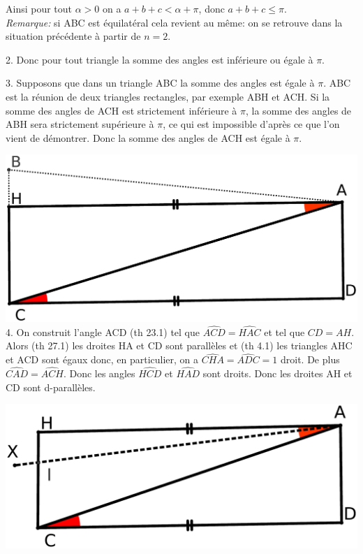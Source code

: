 \documentclass[a4paper, 12pt, twoside]{book}
\begin{document}
Ainsi pour tout $\alpha>0$ on a $a+b+c<\alpha+\pi$, donc $a+b+c\leq \pi$.\\

\textit{Remarque:} si ABC est équilatéral cela revient au même: on se retrouve dans la situation précédente à partir de $n=2$.\

2. Donc pour tout triangle la somme des angles est inférieure ou égale à $\pi$.\

3. Supposons que dans un triangle ABC la somme des angles est égale à $\pi$. ABC est la réunion de deux triangles rectangles, par exemple ABH et ACH. Si la somme des angles de ACH est strictement inférieure à $\pi$, la somme des angles de ABH sera strictement supérieure à $\pi$, ce qui est impossible d'après ce que l'on vient de démontrer. Donc     la somme des angles de ACH est égale à $\pi$.\


 \includegraphics[scale=0.1]{figures/Lobat23.eps}\\
 
 
4. On construit l'angle ACD (th 23.1) tel que $\hat{ACD}=\hat{HAC}$ et tel que $CD=AH$. Alors (th 27.1) les droites HA et CD sont parallèles et  (th 4.1) les triangles AHC et ACD sont égaux donc, en particulier, on a $\hat{CHA}=\hat{ADC}=1$ droit. De plus $\hat{CAD}=\hat{ACH}$. Donc les angles $\hat{HCD}$ et $\hat{HAD}$ sont droits. Donc les droites AH et CD sont d-parallèles.\

 \includegraphics[scale=0.1]{figures/Lobat24.eps}\\
\end{document}
